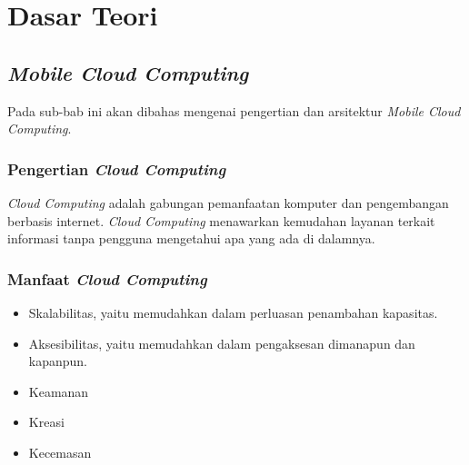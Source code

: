 \chapter{Dasar Teori}
\label{chap:dasarteori}

\section{\textit{Mobile Cloud Computing}}
\label{sec:mobilecloudcomputing}

Pada sub-bab ini akan dibahas mengenai pengertian dan arsitektur \textit{Mobile Cloud Computing}.

\subsection{Pengertian \textit{Cloud Computing}}
\label{subsec:pengertiancloud}
\hspace{0,5cm} \textit{Cloud Computing} adalah gabungan pemanfaatan komputer dan pengembangan berbasis internet. \textit{Cloud Computing} menawarkan kemudahan layanan terkait informasi tanpa pengguna mengetahui apa yang ada di dalamnya.

\subsection{Manfaat \textit{Cloud Computing}}
\label{subsec:pengertianmanfaatcloud}
\begin{itemize}
	\item Skalabilitas, yaitu memudahkan dalam perluasan penambahan kapasitas.
	\item Aksesibilitas, yaitu memudahkan dalam pengaksesan dimanapun dan kapanpun.
	\item Keamanan
	\item Kreasi
	\item Kecemasan
\end{itemize}

